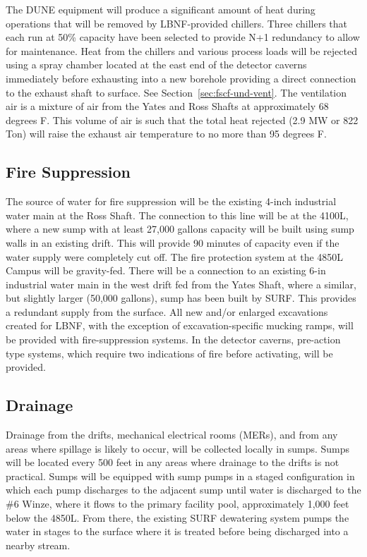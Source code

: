 The DUNE equipment will produce a significant amount of heat during operations that will be removed by LBNF-provided chillers. Three chillers that each run at 50\%  capacity have been selected to provide N+1 redundancy to allow for maintenance. Heat from the chillers and various process loads will be rejected using a spray chamber located at the east end of the detector caverns immediately before exhausting into a new borehole providing a direct connection to the exhaust shaft to surface. See Section~\ref{sec:fscf-und-vent}.  The ventilation air is a mixture of air from the Yates and Ross Shafts at approximately 68 degrees F. This volume of air is such that the total heat rejected (2.9 MW or 822 Ton) will raise the exhaust air temperature to no more than 95 degrees F. 



\subsection{Fire Suppression}
\label{sec:fscf-und-fire-supp}

The source of water for fire suppression will be the existing 4-inch industrial water main at the Ross Shaft. The connection to this line will be at the 4100L, where a new sump with at least 27,000 gallons capacity will be built using sump walls in an existing drift. This will provide 90 minutes of capacity even if the water supply were completely cut off.  The fire protection system at the 4850L Campus will be gravity-fed. There will be a connection to an existing 6-in industrial water main in the west drift fed from the Yates Shaft, where a similar, but slightly larger (50,000 gallons), sump has been built by SURF. This provides a redundant supply from the surface.  All new and/or enlarged excavations created for LBNF, with the exception of excavation-specific mucking ramps, will be provided with fire-suppression systems.  In the detector caverns, pre-action type systems, which require two indications of fire before activating, will be provided.


\subsection{Drainage}
\label{sec:fscf-und-drain}

Drainage from the drifts, mechanical electrical rooms (MERs), and from any areas where spillage is likely to occur, will be collected locally in sumps. Sumps will be located every 500 feet in any areas where drainage to the drifts is not practical. Sumps will be equipped with sump pumps in a staged configuration in which each pump discharges to the adjacent sump until water is discharged to the \#6 Winze, where it flows to the primary facility pool, approximately 1,000 feet below the 4850L. From there, the existing SURF dewatering system pumps the water in stages to the surface where it is treated before being discharged into a nearby stream.

